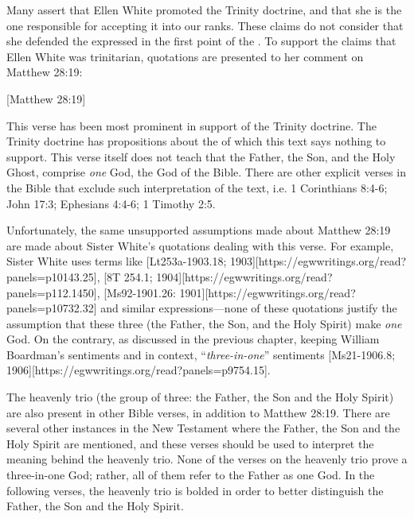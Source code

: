 
Many assert that Ellen White promoted the Trinity doctrine, and that she is the one responsible for accepting it into our ranks. These claims do not consider that she defended the  expressed in the first point of the . To support the claims that Ellen White was trinitarian, quotations are presented to her comment on Matthew 28:19:

[Matthew 28:19]

This verse has been most prominent in support of the Trinity doctrine. The Trinity doctrine has propositions about the  of which this text says nothing to support. This verse itself does not teach that the Father, the Son, and the Holy Ghost, comprise \textit{one} God, the God of the Bible. There are other explicit verses in the Bible that exclude such interpretation of the text, i.e. 1 Corinthians 8:4-6; John 17:3; Ephesians 4:4-6; 1 Timothy 2:5.

Unfortunately, the same unsupported assumptions made about Matthew 28:19 are made about Sister White’s quotations dealing with this verse. For example, Sister White uses terms like [Lt253a-1903.18; 1903][https://egwwritings.org/read?panels=p10143.25], [8T 254.1; 1904][https://egwwritings.org/read?panels=p112.1450], [Ms92-1901.26: 1901][https://egwwritings.org/read?panels=p10732.32] and similar expressions—none of these quotations justify the assumption that these three (the Father, the Son, and the Holy Spirit) make \textit{one} God. On the contrary, as discussed in the previous chapter, keeping William Boardman’s sentiments and  in context, “\textit{three-in-one}” sentiments [Ms21-1906.8; 1906][https://egwwritings.org/read?panels=p9754.15].

The heavenly trio (the group of three: the Father, the Son and the Holy Spirit) are also present in other Bible verses, in addition to Matthew 28:19. There are several other instances in the New Testament where the Father, the Son and the Holy Spirit are mentioned, and these verses should be used to interpret the meaning behind the heavenly trio. None of the verses on the heavenly trio prove a three-in-one God; rather, all of them refer to the Father as one God. In the following verses, the heavenly trio is bolded in order to better distinguish the Father, the Son and the Holy Spirit.

